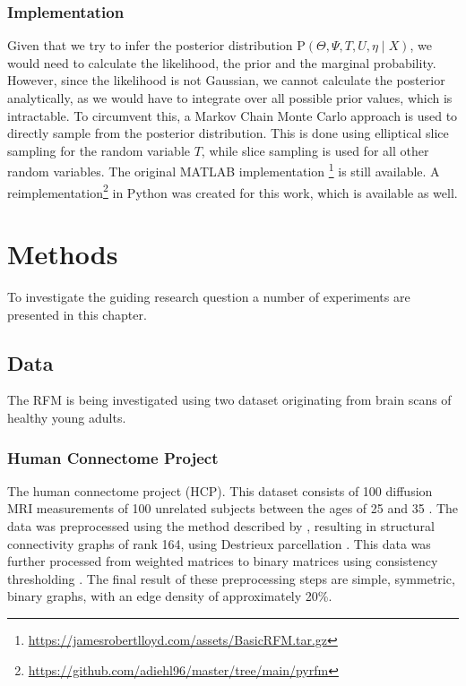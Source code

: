 \documentclass[11pt]{report} %
\begin{document}
\subsection{Implementation}
Given that we try to infer the posterior distribution $\text{P}(\Theta,\Psi,T,U,\eta\mid X)$, we would need to calculate the likelihood, the prior and the marginal probability. 
However, since the likelihood is not Gaussian, we cannot calculate the posterior analytically, as we would have to integrate over all possible prior values, which is intractable. 
To circumvent this, a Markov Chain Monte Carlo approach is used to directly sample from the posterior distribution.
This is done using elliptical slice sampling \cite{murray2010} for the random variable $T$, while slice sampling \cite{neal2003} is used for all other random variables. 
The original MATLAB implementation \footnote{\url{https://jamesrobertlloyd.com/assets/BasicRFM.tar.gz}} is still available. 
A reimplementation\footnote{\url{https://github.com/adiehl96/master/tree/main/pyrfm}} in Python was created for this work, which is available as well.
\chapter{Methods}
To investigate the guiding research question a number of experiments are presented in this chapter. 
\section{Data}
The RFM is being investigated using two dataset originating from brain scans of healthy young adults.
\subsection{Human Connectome Project}
The human connectome project (HCP).
This dataset consists of 100 diffusion MRI measurements of 100 unrelated subjects between the ages of 25 and 35 \cite{vanessen2012}.
The data was preprocessed using the method described by , resulting in structural connectivity graphs of rank 164, using Destrieux parcellation \cite{destrieux2010}.
This data was further processed from weighted matrices to binary matrices using consistency thresholding \cite{roberts2017}. The final result of these preprocessing steps are simple, symmetric, binary graphs, with an edge density of approximately 20\%.
\end{document}

